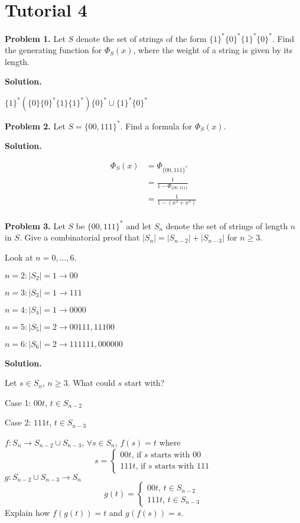 \section{Tutorial 4}
\textbf{Problem 1.} Let $ S $ denote the set of strings of the form
$ \{1\}^* \{0\}^* \{1\}^* \{0\}^* $. Find the generating function for
$ \Phi_S(x) $, where the weight of a string is given by its length.

\textbf{Solution.}

$ \{1\}^*\left( \{0\}\{0\}^* \{1\}\{1\}^* \right)\{0\}^*\cup \{1\}^* \{0\}^* $

\textbf{Problem 2.} Let $ S=\{00,111\}^* $. Find a formula for
$ \Phi_S(x) $.

\textbf{Solution.}

\begin{align*}
    \Phi_S(x)
     & =\Phi_{\{00,111\}^*}           \\
     & =\frac{1}{1-\Phi_{\{00,111\}}} \\
     & =\frac{1}{1-(x^2+x^3)}         \\
\end{align*}

\textbf{Problem 3.} Let $ S $ be $ \{00,111\}^* $ and let $ S_n $
denote the set of strings of length $ n $ in $ S $. Give a combinatorial
proof that $ |S_n|=|S_{n-2}|+|S_{n-3}| $ for $ n\geqslant 3 $.

Look at $ n=0,\ldots,6 $.

$ n=2 : |S_2|=1\rightarrow 00 $

$ n=3 : |S_3|=1 \rightarrow 111 $

$ n=4 : |S_4|=1 \rightarrow 0000$

$ n=5 : |S_5|=2 \rightarrow 00111, 11100 $

$ n=6 : |S_6|=2 \rightarrow 111111,000000 $

\textbf{Solution.}

Let $ s\in S_n $, $ n\geqslant 3 $. What could $ s $ start with?

Case 1: $ 00t $, $ t\in S_{n-2} $

Case 2: $ 111t $, $ t\in S_{n-3} $

$ f: S_n\rightarrow S_{n-2}\cup S_{n-3} $, $\forall s\in S_n $, $ f(s)=t $
where
\[ s=
    \begin{cases}
        00t,\,\text{if $s$ starts with }00 \\
        111t,\,\text{if $s$ starts with }111
    \end{cases} \]
$ g:S_{n-2}\cup S_{n-3}\rightarrow S_n $
\[ g(t)=
    \begin{cases}
        00t,\,t\in S_{n-2} \\
        111t,\,t\in S_{n-3}
    \end{cases} \]
Explain how $ f(g(t))=t $ and $ g(f(s))=s $.

